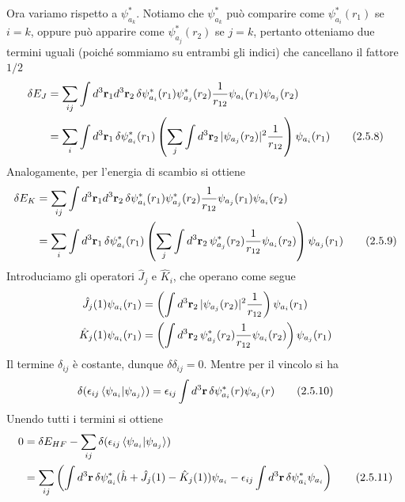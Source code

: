 \documentclass{article}
\begin{document}
Ora variamo rispetto a $\psi^*_{a_k}$. Notiamo che $\psi^*_{a_k}$ può comparire come $\psi^*_{a_i}(r_1)$ se $i = k$, oppure può apparire come $\psi^*_{a_j}(r_2)$ se $j = k$, pertanto otteniamo due termini uguali (poiché sommiamo su entrambi gli indici) che cancellano il fattore $1/2$ 
\begin{align}
    \delta E_J &= \sum_{ij}\int d^3\mathbf{r}_1d^3\mathbf{r}_2 \, \delta\psi^*_{a_i}(r_1)\psi^*_{a_j}(r_2)\frac{1}{r_{12}}\psi_{a_i}(r_1)\psi_{a_j}(r_2) \notag \\
    &= \sum_{i} \int d^3\mathbf{r}_1 \, \delta\psi^*_{a_i}(r_1)\left(\sum_j \int d^3\mathbf{r}_2 \, |\psi_{a_j}(r_2)|^2\frac{1}{r_{12}}\right)\psi_{a_i}(r_1) \tag{2.5.8}
\end{align}
Analogamente, per l'energia di scambio si ottiene 
\begin{align}
    \delta E_K &= \sum_{ij}\int d^3\mathbf{r}_1d^3\mathbf{r}_2 \, \delta\psi^*_{a_i}(r_1)\psi^*_{a_j}(r_2)\frac{1}{r_{12}}\psi_{a_j}(r_1)\psi_{a_i}(r_2) \notag \\
    &= \sum_i \int d^3\mathbf{r}_1 \, \delta\psi^*_{a_i}(r_1)\left(\sum_j \int d^3\mathbf{r}_2 \, \psi^*_{a_j}(r_2)\frac{1}{r_{12}}\psi_{a_i}(r_2)\right)\psi_{a_j}(r_1) \tag{2.5.9}
\end{align}
Introduciamo gli operatori $\hat{J}_j$ e $\hat{K}_i$, che operano come segue 
\begin{align}
    \hat{J}_j(1)\psi_{a_i}(r_1) &= \left(\int d^3\mathbf{r}_2 \, |\psi_{a_j}(r_2)|^2\frac{1}{r_{12}}\right)\psi_{a_i}(r_1) \notag \\
    \hat{K}_j(1)\psi_{a_i}(r_1) &= \left(\int d^3\mathbf{r}_2 \, \psi^*_{a_j}(r_2)\frac{1}{r_{12}}\psi_{a_i}(r_2)\right)\psi_{a_j}(r_1) \notag
\end{align}
Il termine $\delta_{ij}$ è costante, dunque $\delta \delta_{ij} = 0$. Mentre per il vincolo si ha 
\begin{align}
    \delta(\epsilon_{ij}\braket{\psi_{a_i}|\psi_{a_j}}) = \epsilon_{ij}\int d^3\mathbf{r} \, \delta\psi^*_{a_i}(r)\psi_{a_j}(r) \tag{2.5.10}
\end{align}
Unendo tutti i termini si ottiene 
\begin{align}
    0 &= \delta E_{HF} - \sum_{ij}\delta(\epsilon_{ij}\braket{\psi_{a_i}|\psi_{a_j}}) \notag \\
    &= \sum_{ij} \left(\int d^3\mathbf{r} \, \delta\psi^*_{a_i}(\hat{h} + \hat{J}_j(1) - \hat{K}_j(1))\psi_{a_i} - \epsilon_{ij}\int d^3\mathbf{r} \, \delta\psi^*_{a_i}\psi_{a_i}\right) \tag{2.5.11}
\end{align}
\end{document}
